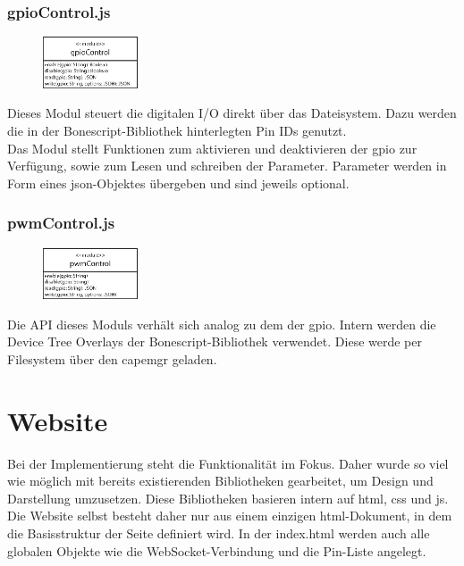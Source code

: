 \subsubsection{gpioControl.js}
\begin{figure}
  \vspace{-18pt}
  \centering
  \includegraphics[width = 0.25\textwidth]{documentation/images/apiGPIOControl.eps}
\end{figure}

Dieses Modul steuert die digitalen I/O direkt über das Dateisystem. Dazu werden die in der Bonescript-Bibliothek hinterlegten Pin IDs genutzt.\\

Das Modul stellt Funktionen zum aktivieren und deaktivieren der \gls{gpio} zur Verfügung, sowie zum Lesen und schreiben der Parameter. Parameter werden in Form eines \gls{json}-Objektes übergeben und sind jeweils optional.

\subsubsection{pwmControl.js}
\begin{figure}
  \vspace{-18pt}
  \centering
  \includegraphics[width = 0.25\textwidth]{documentation/images/apiPWMControl.eps}
\end{figure}

Die API dieses Moduls verhält sich analog zu dem der \gls{gpio}. Intern werden die Device Tree Overlays der Bonescript-Bibliothek verwendet. Diese werde per Filesystem über den \gls{capemgr} geladen.

\section{Website} Bei der Implementierung steht die Funktionalität im Fokus. Daher wurde so viel wie möglich mit bereits existierenden Bibliotheken gearbeitet, um Design und Darstellung umzusetzen. Diese Bibliotheken basieren intern auf \gls{html}, \gls{css} und \gls{js}.\\
Die Website selbst besteht daher nur aus einem einzigen \gls{html}-Dokument, in dem die Basisstruktur der Seite definiert wird. In der index.html werden auch alle globalen Objekte wie die WebSocket-Verbindung und die Pin-Liste angelegt.\\

